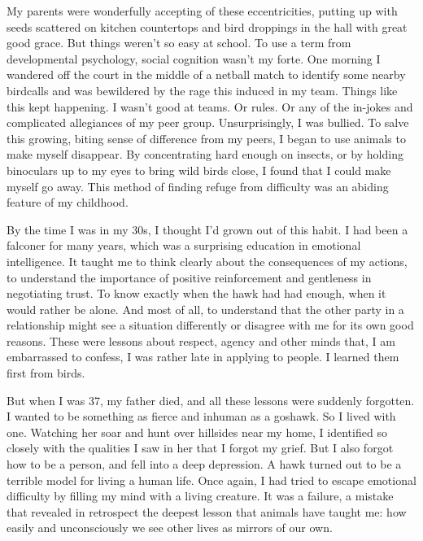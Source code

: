 My parents were wonderfully accepting of these eccentricities, putting
up with seeds scattered on kitchen countertops and bird droppings in the
hall with great good grace. But things weren't so easy at school. To use
a term from developmental psychology, social cognition wasn't my forte.
One morning I wandered off the court in the middle of a netball match to
identify some nearby birdcalls and was bewildered by the rage this
induced in my team. Things like this kept happening. I wasn't good at
teams. Or rules. Or any of the in-jokes and complicated allegiances of
my peer group. Unsurprisingly, I was bullied. To salve this growing,
biting sense of difference from my peers, I began to use animals to make
myself disappear. By concentrating hard enough on insects, or by holding
binoculars up to my eyes to bring wild birds close, I found that I could
make myself go away. This method of finding refuge from difficulty was
an abiding feature of my childhood.

By the time I was in my 30s, I thought I'd grown out of this habit. I
had been a falconer for many years, which was a surprising education in
emotional intelligence. It taught me to think clearly about the
consequences of my actions, to understand the importance of positive
reinforcement and gentleness in negotiating trust. To know exactly when
the hawk had had enough, when it would rather be alone. And most of all,
to understand that the other party in a relationship might see a
situation differently or disagree with me for its own good reasons.
These were lessons about respect, agency and other minds that, I am
embarrassed to confess, I was rather late in applying to people. I
learned them first from birds.

But when I was 37, my father died, and all these lessons were suddenly
forgotten. I wanted to be something as fierce and inhuman as a goshawk.
So I lived with one. Watching her soar and hunt over hillsides near my
home, I identified so closely with the qualities I saw in her that I
forgot my grief. But I also forgot how to be a person, and fell into a
deep depression. A hawk turned out to be a terrible model for living a
human life. Once again, I had tried to escape emotional difficulty by
filling my mind with a living creature. It was a failure, a mistake that
revealed in retrospect the deepest lesson that animals have taught me:
how easily and unconsciously we see other lives as mirrors of our own.

